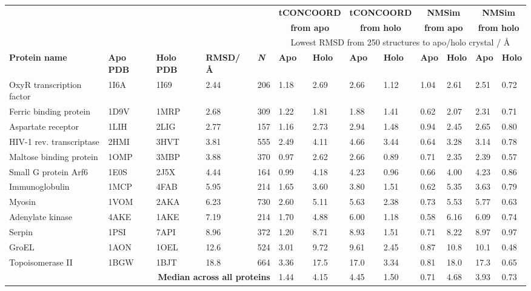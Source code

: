 \begin{table}
\centering

\begin{footnotesize}
\begin{tabular}{ l l l l l l l l l l l l l }
\hline
 &  &  &  &  & \multicolumn{2}{c}{\textbf{tCONCOORD}} & \multicolumn{2}{c}{\textbf{tCONCOORD}} & \multicolumn{2}{c}{\textbf{NMSim}}    & \multicolumn{2}{c}{\textbf{NMSim}} \\
 &  &  &  &  & \multicolumn{2}{c}{\textbf{from apo}}  & \multicolumn{2}{c}{\textbf{from holo}} & \multicolumn{2}{c}{\textbf{from apo}} & \multicolumn{2}{c}{\textbf{from holo}} \\
 &  &  &  &  & \multicolumn{8}{c}{Lowest RMSD from 250 structures to apo/holo crystal / \AA} \\
\textbf{Protein name} & \textbf{Apo PDB} & \textbf{Holo PDB} & \textbf{RMSD\newline / \AA} & \textit{\textbf{N}} & \textbf{Apo} & \textbf{Holo} & \textbf{Apo} & \textbf{Holo} & \textbf{Apo} & \textbf{Holo} & \textbf{Apo} & \textbf{Holo} \\
\hline
OxyR transcription factor & 1I6A & 1I69 & 2.44 & 206 & 1.18 & 2.69 & 2.66 & 1.12 & 1.04 & 2.61 & 2.51 & 0.72 \\
Ferric binding protein    & 1D9V & 1MRP & 2.68 & 309 & 1.22 & 1.81 & 1.88 & 1.41 & 0.62 & 2.07 & 2.31 & 0.71 \\
Aspartate receptor        & 1LIH & 2LIG & 2.77 & 157 & 1.16 & 2.73 & 2.94 & 1.48 & 0.94 & 2.45 & 2.65 & 0.80 \\
HIV-1 rev. transcriptase  & 2HMI & 3HVT & 3.81 & 555 & 2.49 & 4.11 & 4.66 & 3.44 & 0.64 & 3.28 & 3.14 & 0.78 \\
Maltose binding protein   & 1OMP & 3MBP & 3.88 & 370 & 0.97 & 2.62 & 2.66 & 0.89 & 0.71 & 2.35 & 2.39 & 0.57 \\
Small G protein Arf6      & 1E0S & 2J5X & 4.44 & 164 & 0.99 & 4.18 & 4.23 & 0.96 & 0.66 & 4.00 & 4.23 & 0.86 \\
Immunoglobulin            & 1MCP & 4FAB & 5.95 & 214 & 1.65 & 3.60 & 3.80 & 1.51 & 0.62 & 5.35 & 3.63 & 0.79 \\
Myosin                    & 1VOM & 2AKA & 6.23 & 730 & 2.60 & 5.11 & 5.63 & 2.38 & 0.73 & 5.53 & 5.77 & 0.63 \\
Adenylate kinase          & 4AKE & 1AKE & 7.19 & 214 & 1.70 & 4.88 & 6.00 & 1.18 & 0.58 & 6.16 & 6.09 & 0.74 \\
Serpin                    & 1PSI & 7API & 8.96 & 372 & 1.20 & 8.71 & 8.93 & 1.51 & 0.71 & 8.22 & 8.97 & 0.97 \\
GroEL                     & 1AON & 1OEL & 12.6 & 524 & 3.01 & 9.72 & 9.61 & 2.45 & 0.87 & 10.8 & 10.1 & 0.48 \\
Topoisomerase II          & 1BGW & 1BJT & 18.8 & 664 & 3.36 & 17.5 & 17.0 & 3.34 & 0.81 & 18.0 & 17.3 & 0.65 \\
\hline
\multicolumn{5}{r}{\textbf{Median across all proteins}} & 1.44  & 4.15  & 4.45  & 1.50  & 0.71  & 4.68  & 3.93  & 0.73 \\
\hline
\end{tabular}
\end{footnotesize}


\end{table}
